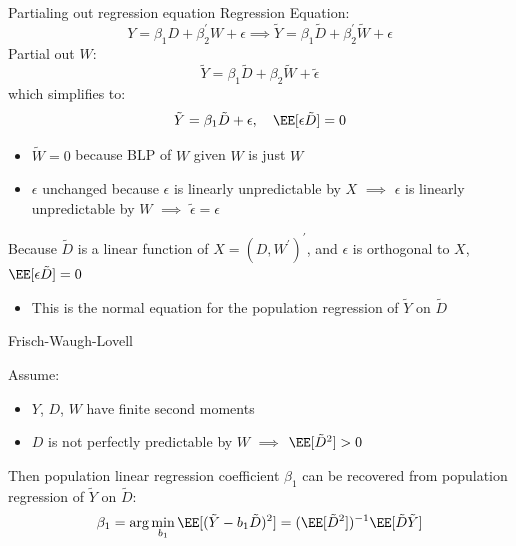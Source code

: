 \documentclass[compress, 8pt]{beamer}
\begin{document}
\begin{frame}{Partialing out regression equation}
    Regression Equation:
    \begin{equation*}
        Y = \beta_1 D + \beta_2^\prime W + \epsilon \implies \tilde{Y} = \beta_1 \tilde{D} + \beta_2^\prime \tilde{W} + \epsilon
    \end{equation*}
    Partial out $W$:
    \begin{equation*}
        \tilde{Y} = \beta_1 \tilde{D} + \beta_2 \tilde{W} + \tilde{\epsilon}
    \end{equation*}
    which simplifies to:
    \begin{equation*}
        \tilde{Y} = \beta_1 \tilde{D} + \epsilon, \quad \EE [\epsilon \tilde{D}] = 0
    \end{equation*}
    \begin{itemize}
        \item $\tilde{W} = 0$ because BLP of $W$ given $W$ is just $W$
        \item $\epsilon$ unchanged because $\epsilon$ is linearly unpredictable by $X$ $\implies$ $\epsilon$ is linearly unpredictable by $W$ $\implies$ $\tilde{\epsilon} = \epsilon$  
    \end{itemize}

    \vspace{2ex}
    Because $\tilde{D}$ is a linear function of $X = (D, W^\prime)^\prime$, and $\epsilon$ is orthogonal to $X$, $\EE[\epsilon \tilde{D}] = 0$
    \begin{itemize}
        \item This is the normal equation for the population regression of $\tilde{Y}$ on $\tilde{D}$
    \end{itemize}

\end{frame}


\begin{frame}{Frisch-Waugh-Lovell}

    Assume:
    \begin{itemize}
        \item $Y$, $D$, $W$ have finite second moments
        \item $D$ is not perfectly predictable by $W$ $\implies$ $\EE[\tilde{D}^2] > 0$
    \end{itemize} 
    \vspace{2ex}
    Then population linear regression coefficient $\beta_1$ can be recovered from population regression of $\tilde{Y}$ on $\tilde{D}$:
    \begin{equation*}
        \beta_1 = \arg \min_{b_1} \EE [(\tilde{Y} - b_1 \tilde{D})^2] = (\EE [\tilde{D}^2])^{-1} \EE [\tilde{D} \tilde{Y}]
    \end{equation*}
\end{frame}
\end{document}
